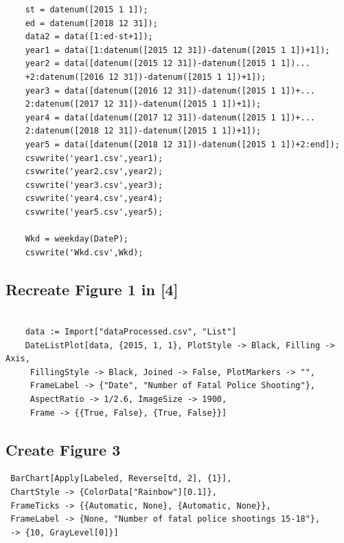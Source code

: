 \documentclass[a4paper]{article}
\begin{document}
{{\begin{verbatim}
    st = datenum([2015 1 1]);
    ed = datenum([2018 12 31]);
    data2 = data([1:ed-st+1]);
    year1 = data([1:datenum([2015 12 31])-datenum([2015 1 1])+1]);
    year2 = data([datenum([2015 12 31])-datenum([2015 1 1])...
    +2:datenum([2016 12 31])-datenum([2015 1 1])+1]);
    year3 = data([datenum([2016 12 31])-datenum([2015 1 1])+...
    2:datenum([2017 12 31])-datenum([2015 1 1])+1]);
    year4 = data([datenum([2017 12 31])-datenum([2015 1 1])+...
    2:datenum([2018 12 31])-datenum([2015 1 1])+1]);
    year5 = data([datenum([2018 12 31])-datenum([2015 1 1])+2:end]);
    csvwrite('year1.csv',year1);
    csvwrite('year2.csv',year2);
    csvwrite('year3.csv',year3);
    csvwrite('year4.csv',year4);
    csvwrite('year5.csv',year5);
    
    Wkd = weekday(DateP);
    csvwrite('Wkd.csv',Wkd);

\end{verbatim}
\subsection{Recreate Figure 1 in [4]}
\begin{verbatim}
 
    data := Import["dataProcessed.csv", "List"]
    DateListPlot[data, {2015, 1, 1}, PlotStyle -> Black, Filling -> Axis, 
     FillingStyle -> Black, Joined -> False, PlotMarkers -> "", 
     FrameLabel -> {"Date", "Number of Fatal Police Shooting"}, 
     AspectRatio -> 1/2.6, ImageSize -> 1900, 
     Frame -> {{True, False}, {True, False}}]
    \end{verbatim}
    \subsection{Create Figure 3}
\begin{verbatim}
 BarChart[Apply[Labeled, Reverse[td, 2], {1}], 
 ChartStyle -> {ColorData["Rainbow"][0.1]},  
 FrameTicks -> {{Automatic, None}, {Automatic, None}}, 
 FrameLabel -> {None, "Number of fatal police shootings 15-18"},
 -> {10, GrayLevel[0]}]

\end{verbatim}
}}
\end{document}
